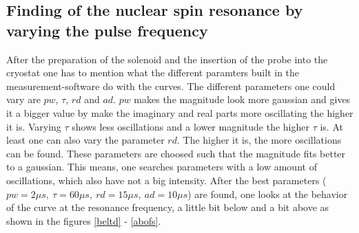     \subsection{Finding of the nuclear spin resonance by varying the pulse frequency}
    \label{task_2}
    After the preparation of the solenoid and the insertion of the probe into the cryostat one has to mention what the different paramters built in the measurement-software do with the curves. The different parameters one could vary are $pw$, $\tau$, $rd$ and $ad$. $pw$ makes the magnitude look more gaussian and gives it a bigger value by make the imaginary and real parts more oscillating the higher it is. Varying $\tau$ shows less oscillations and a lower magnitude the higher $\tau$ is. At least one can also vary the parameter $rd$. The higher it is, the more oscillations can be found. These parameters are choosed such that the magnitude fits better to a gaussian. This means, one searches parameters with a low amount of oscillations, which also have not a big intensity. After the best parameters ($ pw=2\unit{\mu s},\ \tau = 60\unit{\mu s},\ rd = 15\unit{\mu s},\ ad=10\unit{\mu s} $) are found, one looks  at the behavior of the curve at the resonance frequency, a little bit below and a bit above as shown in the figures \ref{beltd} - \ref{abofs}.\\

